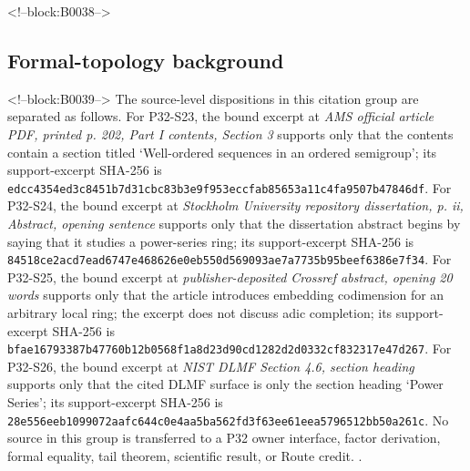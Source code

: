 \documentclass[11pt]{article}
\begin{document}
<!--block:B0038-->
\hypertarget{25-formal-topology-background}{%
\subsection{Formal-topology
background}\label{25-formal-topology-background}}

<!--block:B0039-->
The source-level dispositions in this citation group are separated as follows.
For P32-S23, the bound excerpt at \emph{AMS official article PDF, printed p. 202, Part I contents, Section 3} supports only that the contents contain a section titled `Well-ordered sequences in an ordered semigroup'; its support-excerpt SHA-256 is \texttt{edcc4354\allowbreak{}ed3c8451\allowbreak{}b7d31cbc\allowbreak{}83b3e9f9\allowbreak{}53eccfab\allowbreak{}85653a11\allowbreak{}c4fa9507\allowbreak{}b47846df}.
For P32-S24, the bound excerpt at \emph{Stockholm University repository dissertation, p. ii, Abstract, opening sentence} supports only that the dissertation abstract begins by saying that it studies a power-series ring; its support-excerpt SHA-256 is \texttt{84518ce2\allowbreak{}acd7ead6\allowbreak{}747e4686\allowbreak{}26e0eb55\allowbreak{}0d569093\allowbreak{}ae7a7735\allowbreak{}b95beef6\allowbreak{}386e7f34}.
For P32-S25, the bound excerpt at \emph{publisher-deposited Crossref abstract, opening 20 words} supports only that the article introduces embedding codimension for an arbitrary local ring; the excerpt does not discuss adic completion; its support-excerpt SHA-256 is \texttt{bfae1679\allowbreak{}3387b477\allowbreak{}60b12b05\allowbreak{}68f1a8d2\allowbreak{}3d90cd12\allowbreak{}82d2d033\allowbreak{}2cf83231\allowbreak{}7e47d267}.
For P32-S26, the bound excerpt at \emph{NIST DLMF Section 4.6, section heading} supports only that the cited DLMF surface is only the section heading `Power Series'; its support-excerpt SHA-256 is \texttt{28e556ee\allowbreak{}b1099072\allowbreak{}aafc644c\allowbreak{}0e4aa5ba\allowbreak{}562fd3f6\allowbreak{}3ee61eea\allowbreak{}5796512b\allowbreak{}b50a261c}.
No source in this group is transferred to a P32 owner interface, factor derivation, formal equality, tail theorem, scientific result, or Route credit.
\citep{P32-S23,P32-S24,P32-S25,P32-S26}.
\end{document}
